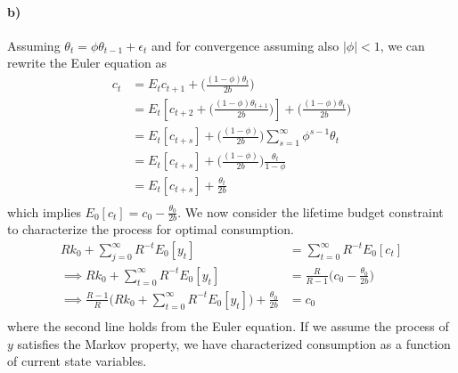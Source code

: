 \documentclass[12pt,letter]{article}
\begin{document}
\paragraph{b)} Assuming $\theta_t = \phi \theta_{t-1} + \epsilon_t$ and for convergence assuming also $|\phi| <1$, we can rewrite the Euler equation as 
\begin{equation}
\begin{split}
	c_t & = E_t c_{t+1}+\bigg(\frac{(1-\phi)\theta_t}{2b}\bigg)\\
	&=E_t\left[  c_{t+2} + \bigg(\frac{(1-\phi)\theta_{t+1}}{2b}\bigg)\right] +\bigg(\frac{(1-\phi)\theta_t}{2b}\bigg)\\
	&= E_t\left[  c_{t+s}\right] +\bigg(\frac{(1-\phi)}{2b}\bigg)\sum_{s = 1}^{\infty}\phi^{s-1}\theta_t\\
	&= E_t\left[  c_{t+s}\right] +\bigg(\frac{(1-\phi)}{2b}\bigg)\frac{\theta_t}{1-\phi}\\
	&= E_t\left[c_{t+s}\right] + \frac{\theta_t}{2b}\\
\end{split}
\end{equation}
which implies $E_0\left[c_{t}\right] = c_0 -\frac{\theta_0}{2b}$. 
We now consider the lifetime budget constraint to characterize the process for optimal consumption. 	
\begin{equation}
\begin{split}
Rk_0 + \sum_{j = 0}^{\infty}R^{-t}E_0\left[ y_t\right] &= \sum_{t=0}^{\infty}R^{-t}E_0\left[c_t\right]\\
\implies Rk_0 + \sum_{t=0}^{\infty}R^{-t}E_0\left[y_t\right]  &= \frac{R}{R-1}\bigg(c_0 -\frac{\theta_0}{2b}\bigg)\\
\implies \frac{R-1}{R}\bigg(Rk_0 + \sum_{t = 0}^{\infty}R^{-t}E_0\left[y_t\right]\bigg) +\frac{\theta_0}{2b} &= c_0\\
\end{split}
\end{equation}
where the second line holds from the Euler equation. If we assume the process of $y$ satisfies the Markov property, we have characterized consumption as a function of current state variables. 
\end{document}
